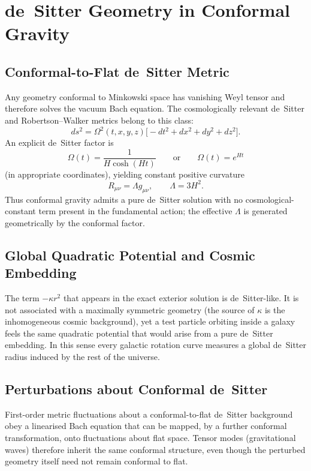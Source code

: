 \documentclass{article}
\begin{document}
\section{de~Sitter Geometry in Conformal Gravity}
\label{sec:desitter}

\subsection{Conformal-to-Flat de~Sitter Metric}

Any geometry conformal to Minkowski space has vanishing Weyl tensor and therefore solves the vacuum Bach equation. The cosmologically relevant de~Sitter and Robertson--Walker metrics belong to this class:
\begin{equation}
ds^2=\Omega^2(t,x,y,z)\bigl[-dt^2+dx^2+dy^2+dz^2\bigr].
\end{equation}
An explicit de~Sitter factor is
\begin{equation}
\Omega(t)=\frac{1}{H\cosh(Ht)}\qquad\text{or}\qquad\Omega(t)=e^{Ht}
\end{equation}
(in appropriate coordinates), yielding constant positive curvature
\begin{equation}
R_{\mu\nu}=\Lambda g_{\mu\nu},\qquad\Lambda=3H^2.
\end{equation}
Thus conformal gravity admits a pure de~Sitter solution with no cosmological-constant term present in the fundamental action; the effective \(\Lambda\) is generated geometrically by the conformal factor.

\subsection{Global Quadratic Potential and Cosmic Embedding}

The term \(-\kappa r^2\) that appears in the exact exterior solution is de~Sitter-like. It is not associated with a maximally symmetric geometry (the source of \(\kappa\) is the inhomogeneous cosmic background), yet a test particle orbiting inside a galaxy feels the same quadratic potential that would arise from a pure de~Sitter embedding. In this sense every galactic rotation curve measures a global de~Sitter radius induced by the rest of the universe.

\subsection{Perturbations about Conformal de~Sitter}

First-order metric fluctuations about a conformal-to-flat de~Sitter background obey a linearised Bach equation that can be mapped, by a further conformal transformation, onto fluctuations about flat space. Tensor modes (gravitational waves) therefore inherit the same conformal structure, even though the perturbed geometry itself need not remain conformal to flat.
\end{document}
